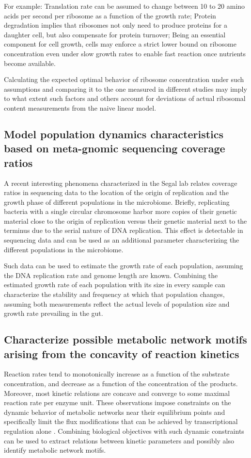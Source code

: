 \documentclass[notitlepage]{article}
\begin{document}
For example:
Translation rate can be assumed to change between 10 to 20 amino acids per second per ribosome as a function of the growth rate;
Protein degradation implies that ribosomes not only need to produce proteins for a daughter cell, but also compensate for protein turnover;
Being an essential component for cell growth, cells may enforce a strict lower bound on ribosome concentration even under slow growth rates to enable fast reaction once nutrients become available.

Calculating the expected optimal behavior of ribosome concentration under such assumptions and comparing it to the one measured in different studies may imply to what extent such factors and others account for deviations of actual ribosomal content measurements from the naive linear model.

\subsection{Model population dynamics characteristics based on meta-gnomic sequencing coverage ratios}
A recent interesting phenomena characterized in the Segal lab relates coverage ratios in sequencing data to the location of the origin of replication and the growth phase of different populations in the microbiome.
Briefly, replicating bacteria with a single circular chromosome harbor more copies of their genetic material close to the origin of replication versus their genetic material next to the terminus due to the serial nature of DNA replication.
This effect is detectable in sequencing data and can be used as an additional parameter characterizing the different populations in the microbiome.

Such data can be used to estimate the growth rate of each population, assuming the DNA replication rate and genome length are known.
Combining the estimated growth rate of each population with its size in every sample can characterize the stability and frequency at which that population changes, assuming both measurements reflect the actual levels of population size and growth rate prevailing in the gut.

\subsection{Characterize possible metabolic network motifs arising from the concavity of reaction kinetics}
Reaction rates tend to monotonically increase as a function of the substrate concentration, and decrease as a function of the concentration of the products.
Moreover, most kinetic relations are concave and converge to some maximal reaction rate per enzyme unit.
These observations impose constraints on the dynamic behavior of metabolic networks near their equilibrium points and specifically limit the flux modifications that can be achieved by transcriptional regulation alone \cite{Chubukov2013}.
Combining biological objectives with such dynamic constraints can be used to extract relations between kinetic parameters and possibly also identify metabolic network motifs.
\end{document}
